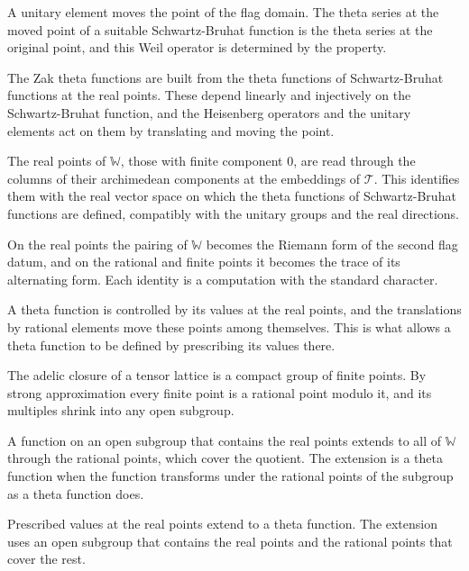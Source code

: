A unitary element moves the point of the flag domain. The theta series at the moved point of a suitable
Schwartz-Bruhat function is the theta series at the original point, and this Weil operator is determined by the
property.

The Zak theta functions are built from the theta functions of Schwartz-Bruhat functions at the real points.
These depend linearly and injectively on the Schwartz-Bruhat function, and the Heisenberg operators and the
unitary elements act on them by translating and moving the point.

The real points of $\mathbb W$, those with finite component $0$, are read through the columns of their archimedean
components at the embeddings of $\mathcal T$. This identifies them with the real vector space on which the theta
functions of Schwartz-Bruhat functions are defined, compatibly with the unitary groups and the real directions.

On the real points the pairing of $\mathbb W$ becomes the Riemann form of the second flag datum, and on the rational
and finite points it becomes the trace of its alternating form. Each identity is a computation with the standard
character.

A theta function is controlled by its values at the real points, and the translations by rational elements
move these points among themselves. This is what allows a theta function to be defined by prescribing its
values there.

The adelic closure of a tensor lattice is a compact group of finite points. By strong approximation every finite
point is a rational point modulo it, and its multiples shrink into any open subgroup.

A function on an open subgroup that contains the real points extends to all of $\mathbb W$ through the rational
points, which cover the quotient. The extension is a theta function when the function transforms under the rational
points of the subgroup as a theta function does.

Prescribed values at the real points extend to a theta function. The extension uses an open subgroup that
contains the real points and the rational points that cover the rest.

